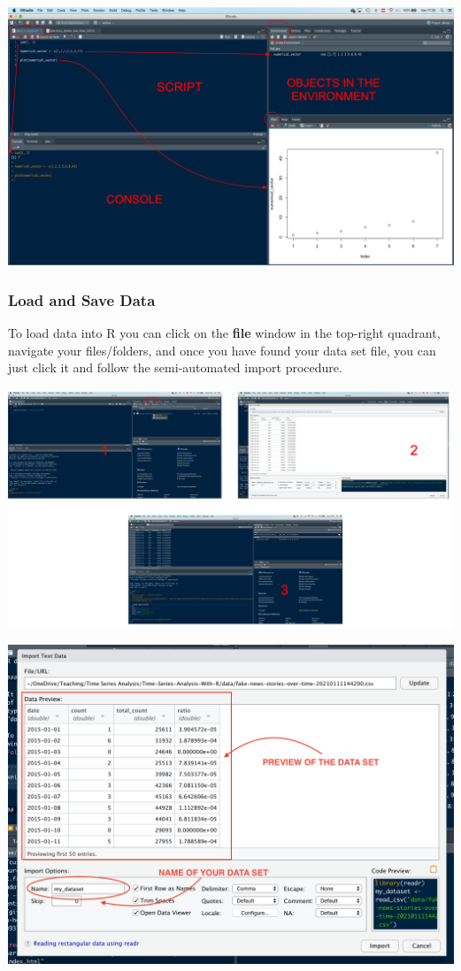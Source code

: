 \documentclass[
]{article}
\begin{document}
\includegraphics[width=35.5in]{images/r-environment}

\hypertarget{load-and-save-data}{%
\subsubsection{Load and Save Data}\label{load-and-save-data}}

To load data into R you can click on the \textbf{file} window in the top-right quadrant, navigate your files/folders, and once you have found your data set file, you can just click it and follow the semi-automated import procedure.

\includegraphics[width=32.4in]{images/load-data}

\includegraphics[width=25.4in]{images/import-data-1}
\end{document}
